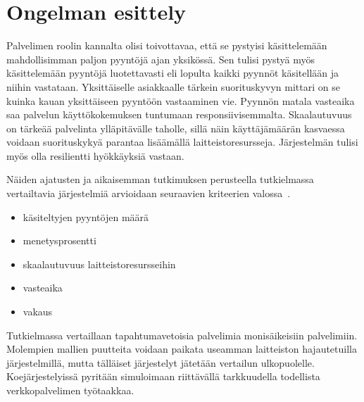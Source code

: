 \documentclass[12pt]{article}
\begin{document}
\section{}
\section{Ongelman esittely}

Palvelimen roolin kannalta olisi toivottavaa, että
se pystyisi käsittelemään mahdollisimman paljon pyyntöjä
ajan yksikössä. Sen tulisi pystyä myös käsittelemään pyyntöjä
luotettavasti eli lopulta kaikki pyynnöt käsitellään ja niihin vastataan.
Yksittäiselle asiakkaalle tärkein suorituskyvyn mittari on se kuinka kauan
yksittäiseen pyyntöön vastaaminen vie. Pyynnön matala vasteaika saa
palvelun käyttökokemuksen tuntumaan responsiivisemmalta.
Skaalautuvuus on tärkeää palvelinta ylläpitävälle taholle, sillä 
näin käyttäjämäärän kasvaessa voidaan suorituskykyä parantaa
lisäämällä laitteistoresursseja. Järjestelmän tulisi myös
olla resilientti hyökkäyksiä vastaan.

Näiden ajatusten ja aikaisemman tutkimuksen perusteella
tutkielmassa vertailtavia järjestelmiä arvioidaan seuraavien 
kriteerien valossa~\cite{gokhale_performance_2006}.
\begin{itemize}
    \item käsiteltyjen pyyntöjen määrä
    \item menetysprosentti
    \item skaalautuvuus laitteistoresursseihin
    \item vasteaika
    \item vakaus
\end{itemize}
Tutkielmassa vertaillaan tapahtumavetoisia palvelimia monisäikeisiin palvelimiin.
Molempien mallien puutteita voidaan paikata useamman laitteiston hajautetuilla 
järjestelmillä, mutta tälläiset järjestelyt jätetään vertailun ulkopuolelle.
Koejärjestelyissä pyritään simuloimaan riittävällä tarkkuudella todellista
verkkopalvelimen työtaakkaa.
\end{document}
